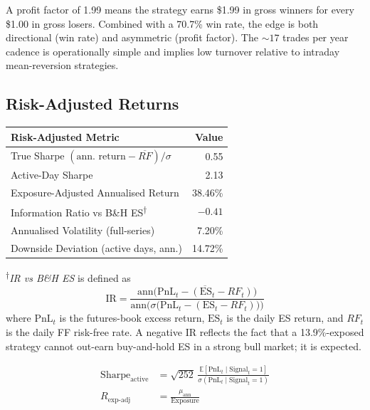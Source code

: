 \documentclass[11pt]{article}
\begin{document}
A profit factor of 1.99 means the strategy earns \$1.99 in gross winners
for every \$1.00 in gross losers. Combined with a 70.7\% win rate, the edge
is both directional (win rate) and asymmetric (profit factor). The
$\sim 17$ trades per year cadence is operationally simple and implies low
turnover relative to intraday mean-reversion strategies.

\subsection{Risk-Adjusted Returns}

\begin{center}
\small
\begin{tabular}{l r}
\toprule
\textbf{Risk-Adjusted Metric} & \textbf{Value}\\
\midrule
True Sharpe $(\text{ann. return} - \overline{RF}) / \sigma$ & 0.55\\
Active-Day Sharpe                       & 2.13\\
Exposure-Adjusted Annualised Return     & 38.46\%\\
Information Ratio vs B\&H ES\textsuperscript{$\dagger$} & $-0.41$\\
Annualised Volatility (full-series)     & 7.20\%\\
Downside Deviation (active days, ann.)  & 14.72\%\\
\bottomrule
\end{tabular}
\end{center}

\footnotesize\textsuperscript{$\dagger$}\textit{IR vs B\&H ES} is defined
as
\[
  \text{IR} = \frac{\mathrm{ann}\big(\overline{\text{PnL}_t -
  (\text{ES}_t - RF_t)}\big)}
  {\mathrm{ann}\big(\sigma\big(\text{PnL}_t - (\text{ES}_t - RF_t)\big)\big)}
\]
where $\text{PnL}_t$ is the futures-book excess return, $\text{ES}_t$ is
the daily ES return, and $RF_t$ is the daily FF risk-free rate. A negative
IR reflects the fact that a 13.9\%-exposed strategy cannot out-earn
buy-and-hold ES in a strong bull market; it is expected.\normalsize

\begin{align}
\mathrm{Sharpe}_{\mathrm{active}}
&= \sqrt{252}\,
\frac{\mathbb{E}\!\left[\text{PnL}_t \mid \text{Signal}_t = 1\right]}
{\sigma\!\left(\text{PnL}_t \mid \text{Signal}_t = 1\right)} \\
R_{\mathrm{exp\text{-}adj}}
&= \frac{\mu_{\mathrm{ann}}}{\mathrm{Exposure}}
\end{align}
\end{document}
